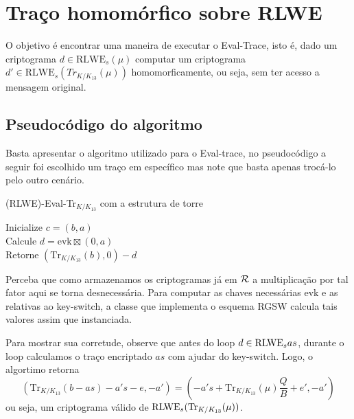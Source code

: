 \section{Traço homomórfico sobre RLWE}

O objetivo é encontrar uma maneira de executar o Eval-Trace, isto é, dado um criptograma $d \in \text{RLWE}_s(\mu)$ computar um criptograma 
$d' \in \text{RLWE}_s(Tr_{K/K_{13}}(\mu))$ homomorficamente, ou seja, sem ter acesso a mensagem original.



\subsection{Pseudocódigo do algoritmo}

Basta apresentar o algoritmo utilizado para o Eval-trace, no pseudocódigo a seguir foi escolhido um traço em específico 
mas note que basta apenas trocá-lo pelo outro cenário.  


\begin{algorithm}[H]
\caption{(RLWE)-Eval-Tr\(_{K/K_{13}}\) com a estrutura de torre}


Inicialize \(c = (b, a)\)\\
Calcule \(d = \text{evk} \boxtimes (0, a)\) \\
Retorne \((\text{Tr}_{K/K_{13}}(b), 0) - d\) 
\end{algorithm}

Perceba que como armazenamos os criptogramas já em $\mathcal{R}$ a multiplicação por tal fator aqui se torna desnecessária. Para computar
as chaves necessárias evk e as relativas ao key-switch, a classe que implementa o esquema RGSW calcula tais valores assim 
que instanciada.

Para mostrar sua corretude, observe que antes do loop $d \in \text{RLWE}_s{as}$, durante o loop calculamos o traço encriptado $as$
com ajudar do key-switch. Logo, o algortimo retorna
$$
  (\text{Tr}_{K/K_{13}}(b - as) - a's - e, - a') = (-a's + \text{Tr}_{K/K_{13}}(\mu) \frac{Q}{B} + e' , -a')
$$
ou seja, um criptograma válido de $\text{RLWE}_s(\text{Tr}_{K/K_{13}}(\mu))$.